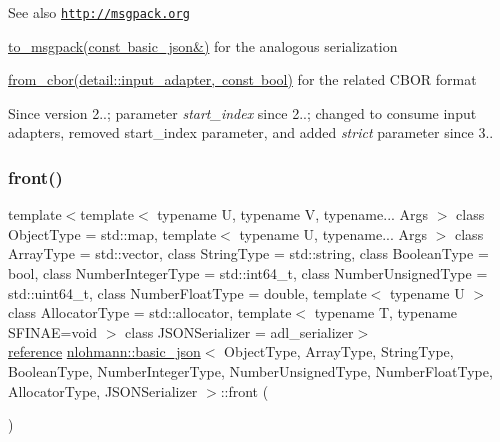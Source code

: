 \begin{DoxySeeAlso}{See also}
\href{http://msgpack.org}{\tt http\+://msgpack.\+org} 

\mbox{\hyperlink{classnlohmann_1_1basic__json_a09ca1dc273d226afe0ca83a9d7438d9c}{to\+\_\+msgpack(const basic\+\_\+json\&)}} for the analogous serialization 

\mbox{\hyperlink{classnlohmann_1_1basic__json_aa9be366b887378bb10c0f1ab510c2f0c}{from\+\_\+cbor(detail\+::input\+\_\+adapter, const bool)}} for the related C\+B\+OR format
\end{DoxySeeAlso}
\begin{DoxySince}{Since}
version 2..; parameter {\itshape start\+\_\+index} since 2..; changed to consume input adapters, removed start\+\_\+index parameter, and added {\itshape strict} parameter since 3.. 
\end{DoxySince}
\mbox{\label{classnlohmann_1_1basic__json_a3acba9c6ceb7214e565fe08c3ba5b352}} 
\subsubsection{\texorpdfstring{front()}{front()}\hspace{0.1cm}{\footnotesize\ttfamily [1/2]}}
{\footnotesize\ttfamily template$<$template$<$ typename U, typename V, typename... Args $>$ class Object\+Type = std\+::map, template$<$ typename U, typename... Args $>$ class Array\+Type = std\+::vector, class String\+Type  = std\+::string, class Boolean\+Type  = bool, class Number\+Integer\+Type  = std\+::int64\+\_\+t, class Number\+Unsigned\+Type  = std\+::uint64\+\_\+t, class Number\+Float\+Type  = double, template$<$ typename U $>$ class Allocator\+Type = std\+::allocator, template$<$ typename T, typename S\+F\+I\+N\+A\+E=void $>$ class J\+S\+O\+N\+Serializer = adl\+\_\+serializer$>$ \\
\mbox{\hyperlink{classnlohmann_1_1basic__json_ac6a5eddd156c776ac75ff54cfe54a5bc}{reference}} \mbox{\hyperlink{classnlohmann_1_1basic__json}{nlohmann\+::basic\+\_\+json}}$<$ Object\+Type, Array\+Type, String\+Type, Boolean\+Type, Number\+Integer\+Type, Number\+Unsigned\+Type, Number\+Float\+Type, Allocator\+Type, J\+S\+O\+N\+Serializer $>$\+::front (\begin{DoxyParamCaption}{ }\end{DoxyParamCaption})\hspace{0.3cm}{\ttfamily [inline]}}



